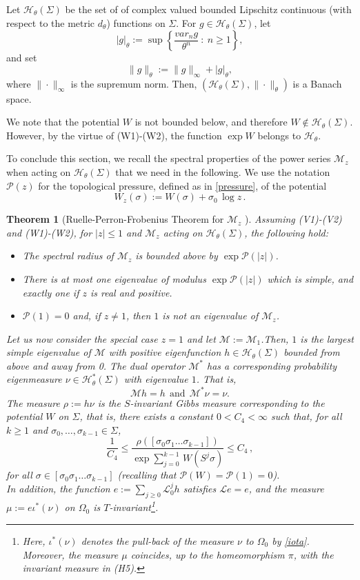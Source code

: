 \documentclass{amsart}
\newtheorem{theorem}{Theorem}[section]
\theoremstyle{definition}
\theoremstyle{remark}
\theoremstyle{definition}
\numberwithin{equation}{section}
\newcommand{\set}[1]{\left\{#1\right\}}
\newcommand{\CH}{{\mathcal H}}
\newcommand{\CL}{{\mathcal L}}
\newcommand{\CM}{{\mathcal M}}
\newcommand{\CP}{{\mathcal P}}
\newcommand{\CW}{{W}}
\begin{document}
Let $\CH_{\theta}(\Sigma)$ be the set of of complex valued bounded Lipschitz continuous (with respect to the metric $d_{\theta}$) functions on $\Sigma$. For $g\in \CH_{\theta}(\Sigma)$, let
\[
|g|_{\theta} := \sup \set{\frac{var_{n}g}{\theta^{n}} \ : \ n \ge 1},
\]
and set
\[
        \| g \|_{\theta} := \|g\|_{\infty} + |g|_{\theta},
\]
where $\|\cdot \|_{\infty}$ is the supremum norm. Then, $(\CH_{\theta}(\Sigma), \|  \cdot \|_{\theta})$ is a Banach space.

We note that the potential $\CW$ is not bounded below, and therefore $\CW \notin \CH_{\theta}(\Sigma)$. However, by the virtue of (W1)-(W2), the function $\exp \CW$ belongs to $ \CH_{\theta}$.

To conclude this section, we recall the spectral properties of the power series $\CM_z$ when acting on $\CH_{\theta}(\Sigma)$ that we need in the following. We use the notation $\CP(z)$ for the topological pressure, defined as in \eqref{pressure}, of the potential
\[
\CW_z(\sigma) := \CW(\sigma) + \sigma_0\, \log z\, .
\]

\begin{theorem}[Ruelle-Perron-Frobenius Theorem for $\CM_z$ \cite{Is}] \label{thm:RPF_M}
Assuming (V1)-(V2) and (W1)-(W2), for $|z|\le 1$ and $\CM_z$ acting on $\CH_{\theta}(\Sigma)$, the following hold:
\begin{itemize}
\item[(i)] The spectral radius of $\CM_z$ is bounded above by $\exp \CP(|z|)$.
\item[(ii)] There is at most one eigenvalue of modulus $\exp \CP(|z|)$ which is simple, and exactly one if $z$ is real and positive.
\item[(iii)] $\CP(1)=0$ and, if $z\not= 1$, then $1$ is not an eigenvalue of $\CM_z$.
\end{itemize}
Let us now consider the special case $z=1$ and let $\CM:= \CM_1$.Then, $1$ is the largest simple eigenvalue of $\CM$ with positive eigenfunction $h \in \CH_{\theta}(\Sigma)$ bounded from above and away from 0. The dual operator $\CM^*$ has a corresponding probability eigenmeasure $\nu \in \CH_{\theta}^{*}(\Sigma)$ with eigenvalue $1$. That is,
        \[
        \CM h = h \ \ \text{and} \ \ \CM^{*} \nu= \nu.
        \]
The measure $\rho := h\nu$ is the $S$-invariant Gibbs measure corresponding to the potential $\CW$ on $\Sigma$, that is, there exists a constant $0<C_4<\infty$ such that, for all $k\ge 1$ and $\sigma_0,\dots,\sigma_{k-1} \in \Sigma$,
\[
\frac{1}{C_4} \le \frac{\rho([\sigma_0 \sigma_1 \dots \sigma_{k-1}])}{\exp \sum_{j=0}^{k-1}\, \CW(S^j \sigma)} \le C_4\, ,
\]
for all $\sigma \in [\sigma_0 \sigma_1 \dots \sigma_{k-1}]$ (recalling that $\CP(\CW)=\CP(1)=0$).\\ 
In addition, the function $e:= \sum_{j\ge 0} \CL_0^j h$ satisfies $\CL e =e $, and the measure $\mu:= e \iota^*(\nu)$ on $\Omega_0$ is $T$-invariant\footnote{Here, $\iota^*(\nu)$ denotes the pull-back of the measure $\nu$ to $\Omega_0$ by \eqref{iota}. Moreover, the measure $\mu$ coincides, up to the homeomorphism $\pi$, with the invariant measure in (H5).}. 
\end{theorem} 
 
\end{document}
